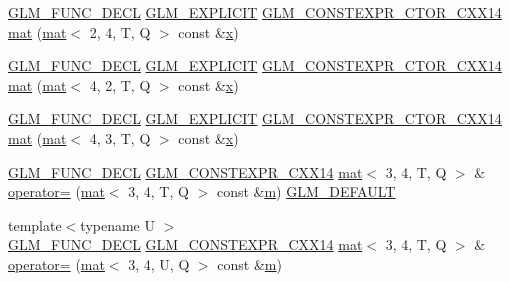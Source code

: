 \begin{DoxyCompactItemize}
\item 
\hyperlink{setup_8hpp_ab2d052de21a70539923e9bcbf6e83a51}{G\+L\+M\+\_\+\+F\+U\+N\+C\+\_\+\+D\+E\+CL} \hyperlink{setup_8hpp_a6c74f5a5e7b134ab69023ff9a30d4d5d}{G\+L\+M\+\_\+\+E\+X\+P\+L\+I\+C\+IT} \hyperlink{setup_8hpp_a0900f9145e68bf6061b6f5e7be3fa751}{G\+L\+M\+\_\+\+C\+O\+N\+S\+T\+E\+X\+P\+R\+\_\+\+C\+T\+O\+R\+\_\+\+C\+X\+X14} \hyperlink{structglm_1_1mat_3_013_00_014_00_01_t_00_01_q_01_4_a400e175a1e3995a836516e7e2aebc91a}{mat} (\hyperlink{structglm_1_1mat}{mat}$<$ 2, 4, T, Q $>$ const \&\hyperlink{_s_d_l__opengl_8h_ad0e63d0edcdbd3d79554076bf309fd47}{x})
\item 
\hyperlink{setup_8hpp_ab2d052de21a70539923e9bcbf6e83a51}{G\+L\+M\+\_\+\+F\+U\+N\+C\+\_\+\+D\+E\+CL} \hyperlink{setup_8hpp_a6c74f5a5e7b134ab69023ff9a30d4d5d}{G\+L\+M\+\_\+\+E\+X\+P\+L\+I\+C\+IT} \hyperlink{setup_8hpp_a0900f9145e68bf6061b6f5e7be3fa751}{G\+L\+M\+\_\+\+C\+O\+N\+S\+T\+E\+X\+P\+R\+\_\+\+C\+T\+O\+R\+\_\+\+C\+X\+X14} \hyperlink{structglm_1_1mat_3_013_00_014_00_01_t_00_01_q_01_4_a268ff308040e489c8f629b012767b11c}{mat} (\hyperlink{structglm_1_1mat}{mat}$<$ 4, 2, T, Q $>$ const \&\hyperlink{_s_d_l__opengl_8h_ad0e63d0edcdbd3d79554076bf309fd47}{x})
\item 
\hyperlink{setup_8hpp_ab2d052de21a70539923e9bcbf6e83a51}{G\+L\+M\+\_\+\+F\+U\+N\+C\+\_\+\+D\+E\+CL} \hyperlink{setup_8hpp_a6c74f5a5e7b134ab69023ff9a30d4d5d}{G\+L\+M\+\_\+\+E\+X\+P\+L\+I\+C\+IT} \hyperlink{setup_8hpp_a0900f9145e68bf6061b6f5e7be3fa751}{G\+L\+M\+\_\+\+C\+O\+N\+S\+T\+E\+X\+P\+R\+\_\+\+C\+T\+O\+R\+\_\+\+C\+X\+X14} \hyperlink{structglm_1_1mat_3_013_00_014_00_01_t_00_01_q_01_4_ac67882566acbc0b0860fb960ad6cc0b5}{mat} (\hyperlink{structglm_1_1mat}{mat}$<$ 4, 3, T, Q $>$ const \&\hyperlink{_s_d_l__opengl_8h_ad0e63d0edcdbd3d79554076bf309fd47}{x})
\item 
\hyperlink{setup_8hpp_ab2d052de21a70539923e9bcbf6e83a51}{G\+L\+M\+\_\+\+F\+U\+N\+C\+\_\+\+D\+E\+CL} \hyperlink{setup_8hpp_a4dd12abf5e1164bc57f3a34671d03844}{G\+L\+M\+\_\+\+C\+O\+N\+S\+T\+E\+X\+P\+R\+\_\+\+C\+X\+X14} \hyperlink{structglm_1_1mat}{mat}$<$ 3, 4, T, Q $>$ \& \hyperlink{structglm_1_1mat_3_013_00_014_00_01_t_00_01_q_01_4_a498ebaec8ed897ad37556d87ed7e69f5}{operator=} (\hyperlink{structglm_1_1mat}{mat}$<$ 3, 4, T, Q $>$ const \&\hyperlink{_s_d_l__opengl__glext_8h_af593500c283bf1a787a6f947f503a5c2}{m}) \hyperlink{setup_8hpp_aefce7051c376a64ba89fa93a9f63bc2c}{G\+L\+M\+\_\+\+D\+E\+F\+A\+U\+LT}
\item 
{\footnotesize template$<$typename U $>$ }\\\hyperlink{setup_8hpp_ab2d052de21a70539923e9bcbf6e83a51}{G\+L\+M\+\_\+\+F\+U\+N\+C\+\_\+\+D\+E\+CL} \hyperlink{setup_8hpp_a4dd12abf5e1164bc57f3a34671d03844}{G\+L\+M\+\_\+\+C\+O\+N\+S\+T\+E\+X\+P\+R\+\_\+\+C\+X\+X14} \hyperlink{structglm_1_1mat}{mat}$<$ 3, 4, T, Q $>$ \& \hyperlink{structglm_1_1mat_3_013_00_014_00_01_t_00_01_q_01_4_a78ce17c72bd4bffddaaef8c5e7f8348a}{operator=} (\hyperlink{structglm_1_1mat}{mat}$<$ 3, 4, U, Q $>$ const \&\hyperlink{_s_d_l__opengl__glext_8h_af593500c283bf1a787a6f947f503a5c2}{m})

\end{DoxyCompactItemize}
